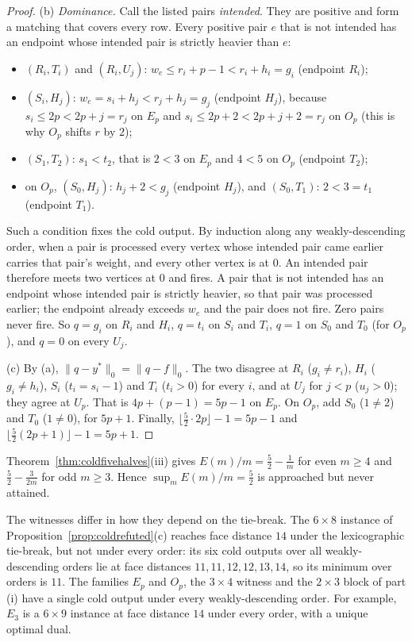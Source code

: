 \begin{proof}
(b) \emph{Dominance.} Call the listed pairs \emph{intended}. They are positive and form a matching
that covers every row. Every positive pair $e$ that is not intended has an endpoint whose intended
pair is strictly heavier than $e$:
\begin{itemize}
\item $(R_i,T_i)$ and $(R_i,U_j)$: $w_e \le r_i+p-1 < r_i+h_i = g_i$ (endpoint $R_i$);
\item $(S_i,H_j)$: $w_e = s_i+h_j < r_j+h_j = g_j$ (endpoint $H_j$), because $s_i \le 2p < 2p+j = r_j$
  on $E_p$ and $s_i \le 2p+2 < 2p+j+2 = r_j$ on $O_p$ (this is why $O_p$ shifts $r$ by $2$);
\item $(S_1,T_2)$: $s_1 < t_2$, that is $2 < 3$ on $E_p$ and $4 < 5$ on $O_p$ (endpoint $T_2$);
\item on $O_p$, $(S_0,H_j)$: $h_j+2 < g_j$ (endpoint $H_j$), and $(S_0,T_1)$: $2 < 3 = t_1$
  (endpoint $T_1$).
\end{itemize}
Such a condition fixes the cold output. By induction along any weakly-descending order, when a
pair is processed every vertex whose intended pair came earlier carries that pair's weight, and
every other vertex is at $0$. An intended pair therefore meets two vertices at $0$ and fires. A
pair that is not intended has an endpoint whose intended pair is strictly heavier, so that pair
was processed earlier; the endpoint already exceeds $w_e$ and the pair does not fire. Zero pairs
never fire. So $q = g_i$ on $R_i$ and $H_i$, $q = t_i$ on $S_i$ and $T_i$, $q = 1$ on $S_0$ and
$T_0$ (for $O_p$), and $q = 0$ on every $U_j$.

(c) By (a), $\|q-y^*\|_0 = \|q-f\|_0$. The two disagree at $R_i$ ($g_i \ne r_i$), $H_i$
($g_i \ne h_i$), $S_i$ ($t_i = s_i - 1$) and $T_i$ ($t_i > 0$) for every $i$, and at $U_j$ for
$j < p$ ($u_j > 0$); they agree at $U_p$. That is $4p + (p-1) = 5p-1$ on $E_p$. On $O_p$, add
$S_0$ ($1 \ne 2$) and $T_0$ ($1 \ne 0$), for $5p+1$. Finally,
$\lfloor \tfrac52 \cdot 2p \rfloor - 1 = 5p-1$ and
$\lfloor \tfrac52 (2p+1) \rfloor - 1 = 5p+1$.
\end{proof}

\begin{remark}\label{rem:coldconstant}
Theorem~\ref{thm:coldfivehalves}(iii) gives
$E(m)/m = \tfrac52 - \tfrac1m$ for even $m \ge 4$ and $\tfrac52 - \tfrac{3}{2m}$ for odd
$m \ge 3$. Hence $\sup_m E(m)/m = \tfrac52$ is approached but never attained.

The witnesses differ in how they depend on the tie-break. The $6\times8$ instance of
Proposition~\ref{prop:coldrefuted}(c) reaches face distance $14$ under the lexicographic
tie-break, but not under every order: its six cold outputs over all weakly-descending orders lie at
face distances $11, 11, 12, 12, 13, 14$, so its minimum over orders is $11$. The families $E_p$ and $O_p$, the
$3\times4$ witness and the $2\times3$ block of part (i) have a single cold output under every
weakly-descending order. For example, $E_3$ is a $6\times9$ instance at face distance $14$ under
every order, with a unique optimal dual.
\end{remark}

